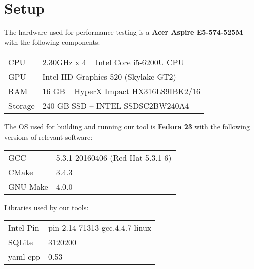 \chapter{Setup}
\label{appendix:setup}

The hardware used for performance testing is a \textbf{Acer Aspire E5-574-525M} with the following components:

\begin{tabular}{l l}
	CPU & 2.30GHz x 4 -- Intel Core i5-6200U CPU \\
	GPU & Intel HD Graphics 520 (Skylake GT2)  \\
	RAM & 16 GB -- HyperX Impact HX316LS9IBK2/16 \\
	Storage & 240 GB SSD -- INTEL SSDSC2BW240A4
\end{tabular}

The OS used for building and running our tool is \textbf{Fedora 23} with the following versions of relevant software:

\begin{tabular}{l l}
	GCC & 5.3.1 20160406 (Red Hat 5.3.1-6) \\
	CMake & 3.4.3 \\
	GNU Make & 4.0.0
\end{tabular}

Libraries used by our tools:

\begin{tabular}{l l}
	Intel Pin & pin-2.14-71313-gcc.4.4.7-linux  \\
	SQLite & 3120200 \\
	yaml-cpp & 0.53
\end{tabular}